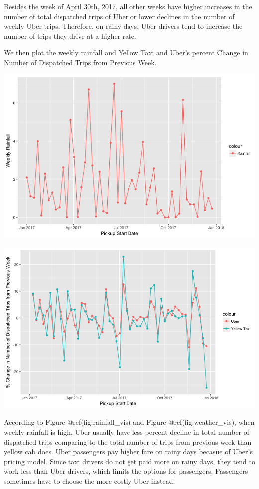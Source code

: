 \documentclass[12pt,twoside]{reedthesis}
\theoremstyle{definition}
\theoremstyle{definition}
\theoremstyle{definition}
\theoremstyle{remark}
\begin{document}
Besides the week of April 30th, 2017, all other weeks have higher
increases in the number of total dispatched trips of Uber or lower
declines in the number of weekly Uber trips. Therefore, on rainy days,
Uber drivers tend to increase the number of trips they drive at a higher
rate.

We then plot the weekly rainfall and Yellow Taxi and Uber's percent
Change in Number of Dispatched Trips from Previous Week.
\begin{center}\includegraphics[width=6.37in]{figure/rainfall_vis} \end{center}
\begin{center}\includegraphics[width=6.51in]{figure/weather_vis} \end{center}

According to Figure @ref(fig:rainfall\_vis) and Figure
@ref(fig:weather\_vis), when weekly rainfall is high, Uber usually have
less percent decline in total number of dispatched trips comparing to
the total number of trips from previous week than yellow cab does. Uber
passengers pay higher fare on rainy days becasue of Uber's pricing
model. Since taxi drivers do not get paid more on rainy days, they tend
to work less than Uber drivers, which limits the options for passengers.
Passengers sometimes have to choose the more costly Uber instead.
\end{document}

